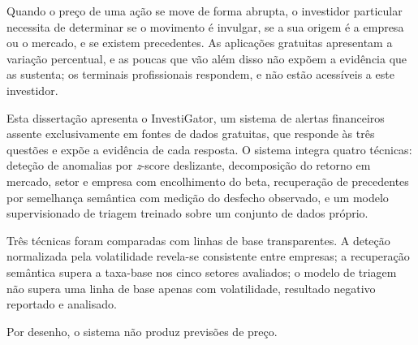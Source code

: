 \begin{abstractotherlanguage}
Quando o preço de uma ação se move de forma abrupta, o investidor particular necessita de
determinar se o movimento é invulgar, se a sua origem é a empresa ou o mercado, e se existem
precedentes. As aplicações gratuitas apresentam a variação percentual, e as poucas que vão
além disso não expõem a evidência que as sustenta; os terminais profissionais respondem, e
não estão acessíveis a este investidor.

Esta dissertação apresenta o InvestiGator, um sistema de alertas financeiros assente exclusivamente
em fontes de dados gratuitas, que responde às três questões e expõe a evidência de cada
resposta. O sistema integra quatro técnicas: deteção de anomalias por \emph{z}-score deslizante,
decomposição do retorno em mercado, setor e empresa com encolhimento do beta, recuperação de
precedentes por semelhança semântica com medição do desfecho observado, e um modelo supervisionado
de triagem treinado sobre um conjunto de dados próprio.

Três técnicas foram comparadas com linhas de base transparentes. A deteção normalizada pela
volatilidade revela-se consistente entre empresas; a recuperação semântica supera a taxa-base nos
cinco setores avaliados; o modelo de triagem não supera uma linha de base apenas com
volatilidade, resultado negativo reportado e analisado.

Por desenho, o sistema não produz previsões de preço.
\end{abstractotherlanguage}

